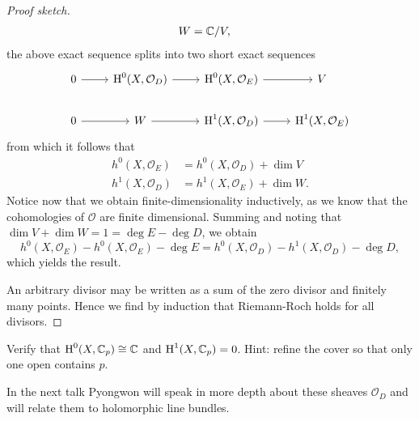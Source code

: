 \documentclass{amsart}
\begin{document}
\begin{proof}[Proof sketch]
\begin{align*}
        W &= \mathbb{C}/V,
    \end{align*}
    the above exact sequence splits into two short exact sequences
    \begin{equation*}
        \begin{tikzcd}
            0\rar & \HH^0(X, \mathcal{O}_D)\rar & \HH^0(X, \mathcal{O}_E)\rar & V \\
            0\rar & W\rar & \HH^1(X, \mathcal{O}_D)\rar & \HH^1(X,\mathcal{O}_E)
        \end{tikzcd}
    \end{equation*}
    from which it follows that
    \begin{align*}
        h^0(X,\mathcal{O}_E) &= h^0(X,\mathcal{O}_D)+\dim V\\
        h^1(X,\mathcal{O}_D) &= h^1(X,\mathcal{O}_E)+\dim W.
    \end{align*}
    Notice now that we obtain finite-dimensionality inductively, as we know that the cohomologies
    of $\mathcal{O}$ are finite dimensional.
    Summing and noting that $\dim V+\dim W=1=\deg E-\deg D$, we obtain
    \begin{equation*}
        h^0(X,\mathcal{O}_E)-h^0(X,\mathcal{O}_E)-\deg E = h^0(X,\mathcal{O}_D)-h^1(X,\mathcal{O}_D)-\deg D,
    \end{equation*}
    which yields the result.

    An arbitrary divisor may be written as a sum of the zero divisor and finitely many points.
    Hence we find by induction that Riemann-Roch holds for all divisors.
\end{proof}

\begin{exercise}
    Verify that $\operatorname{H}^0(X, \mathbb{C}_p)\cong\mathbb{C}$ and $\operatorname{H}^1(X, \mathbb{C}_p)=0$. Hint: refine the cover so that only
    one open contains $p$.
\end{exercise}

In the next talk Pyongwon will speak in more depth about these sheaves $\mathcal{O}_D$ and will
relate them to holomorphic line bundles.
\end{document}
